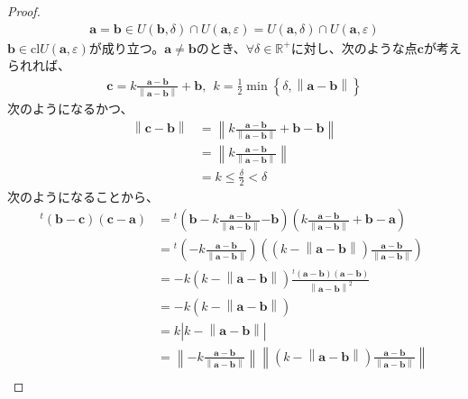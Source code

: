 \documentclass[dvipdfmx]{jsarticle}
\begin{document}
\begin{proof}
\begin{align*}
\mathbf{a} = \mathbf{b} \in U\left( \mathbf{b},\delta \right) \cap U\left( \mathbf{a},\varepsilon \right) = U\left( \mathbf{a},\delta \right) \cap U\left( \mathbf{a},\varepsilon \right)
\end{align*}
$\mathbf{b} \in \mathrm{cl}{U\left( \mathbf{a},\varepsilon \right)}$が成り立つ。$\mathbf{a} \neq \mathbf{b}$のとき、$\forall\delta \in \mathbb{R}^{+}$に対し、次のような点$\mathbf{c}$が考えられれば、
\begin{align*}
\mathbf{c} = k\frac{\mathbf{a} - \mathbf{b}}{\left\| \mathbf{a} - \mathbf{b} \right\|} + \mathbf{b},\ \ k = \frac{1}{2}\min\left\{ \delta,\left\| \mathbf{a} - \mathbf{b} \right\| \right\}
\end{align*}
次のようになるかつ、
\begin{align*}
\left\| \mathbf{c} - \mathbf{b} \right\| &= \left\| k\frac{\mathbf{a} - \mathbf{b}}{\left\| \mathbf{a} - \mathbf{b} \right\|} + \mathbf{b} - \mathbf{b} \right\|\\
&= \left\| k\frac{\mathbf{a} - \mathbf{b}}{\left\| \mathbf{a} - \mathbf{b} \right\|} \right\|\\
&= k \leq \frac{\delta}{2} < \delta
\end{align*}
次のようになることから、
\begin{align*}
{}^{t}\left( \mathbf{b - c} \right)\left( \mathbf{c - a} \right) &={}^{t}\left( \mathbf{b} - k\frac{\mathbf{a} - \mathbf{b}}{\left\| \mathbf{a} - \mathbf{b} \right\|}\mathbf{- b} \right)\left( k\frac{\mathbf{a} - \mathbf{b}}{\left\| \mathbf{a} - \mathbf{b} \right\|} + \mathbf{b} - \mathbf{a} \right)\\
&={}^{t}\left( - k\frac{\mathbf{a} - \mathbf{b}}{\left\| \mathbf{a} - \mathbf{b} \right\|} \right)\left( \left( k - \left\| \mathbf{a} - \mathbf{b} \right\| \right)\frac{\mathbf{a} - \mathbf{b}}{\left\| \mathbf{a} - \mathbf{b} \right\|} \right)\\
&= - k\left( k - \left\| \mathbf{a} - \mathbf{b} \right\| \right)\frac{{}^{t}\left( \mathbf{a} - \mathbf{b} \right)\left( \mathbf{a} - \mathbf{b} \right)}{\left\| \mathbf{a - b} \right\|^{2}}\\
&= - k\left( k - \left\| \mathbf{a} - \mathbf{b} \right\| \right)\\
&= k\left| k - \left\| \mathbf{a} - \mathbf{b} \right\| \right|\\
&= \left\| - k\frac{\mathbf{a} - \mathbf{b}}{\left\| \mathbf{a} - \mathbf{b} \right\|} \right\|\left\| \left( k - \left\| \mathbf{a} - \mathbf{b} \right\| \right)\frac{\mathbf{a} - \mathbf{b}}{\left\| \mathbf{a} - \mathbf{b} \right\|} \right\|\\

\end{align*}
\end{proof}
\end{document}
